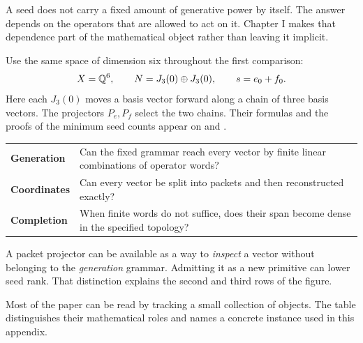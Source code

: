 
A seed does not carry a fixed amount of generative power by itself. The answer depends on the operators that are allowed to act on it. Chapter I makes that dependence part of the mathematical object rather than leaving it implicit.

Use the same space of dimension six throughout the first comparison:
\[
X=\mathbb Q^6,\qquad N=J_3(0)\oplus J_3(0),\qquad
s=e_0+f_0.
\]
Here each $J_3(0)$ moves a basis vector forward along a chain of three basis vectors. The projectors $P_e,P_f$ select the two chains. Their formulas and the proofs of the minimum seed counts appear on  and .


\begin{tabularx}{\linewidth}{@{}p{.18\linewidth}Y@{}}
\textbf{Generation} & Can the fixed grammar reach every vector by finite linear combinations of operator words?\\[4pt]
\textbf{Coordinates} & Can every vector be split into packets and then reconstructed exactly?\\[4pt]
\textbf{Completion} & When finite words do not suffice, does their span become dense in the specified topology?
\end{tabularx}

A packet projector can be available as a way to \emph{inspect} a vector without belonging to the \emph{generation} grammar. Admitting it as a new primitive can lower seed rank. That distinction explains the second and third rows of the figure.


Most of the paper can be read by tracking a small collection of objects. The table distinguishes their mathematical roles and names a concrete instance used in this appendix.

